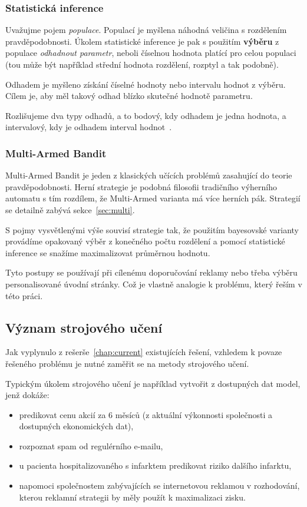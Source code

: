 \documentclass[thesis=M,czech]{FITthesis}[2014/05/07]
\begin{document}
\subsubsection{Statistická inference}
\label{inferno}
Uvažujme pojem \emph{populace}. Populací je myšlena náhodná veličina s rozdělením pravděpodobnosti. Úkolem statistické inference je pak s použitím \textbf{výběru} z populace \emph{odhadnout parametr}, neboli číselnou hodnota platící pro celou populaci (tou může být například střední hodnota rozdělení, rozptyl a tak podobně).

Odhadem je myšleno získání číselné hodnoty nebo intervalu hodnot z výběru. Cílem je, aby měl takový odhad blízko skutečné hodnotě parametru.

Rozlišujeme dva typy odhadů, a to bodový, kdy odhadem je jedna hodnota, a intervalový, kdy je odhadem interval hodnot~\cite{pst5}. 

\subsubsection{Multi-Armed Bandit}
\label{sub:mabandit}
Multi-Armed Bandit je jeden z klasických učících problémů zasahující do teorie pravděpodobnosti. Herní strategie je podobná filosofii tradičního výherního automatu s tím rozdílem, že Multi-Armed varianta má více herních pák. Strategií se detailně zabývá sekce~\ref{sec:multi}.

S pojmy vysvětlenými výše souvisí strategie tak, že použitím bayesovské varianty provádíme opakovaný výběr z konečného počtu rozdělení a pomocí statistické inference se snažíme maximalizovat průměrnou hodnotu.

Tyto postupy se používají při cílenému doporučování reklamy nebo třeba výběru personalisované úvodní stránky. Což je vlastně analogie k problému, který řeším v této práci.

\subsection{Význam strojového učení}
\label{sec:machine}

Jak vyplynulo z rešerše~\ref{chap:current} existujících řešení, vzhledem k povaze řešeného problému je nutné zaměřit se na metody strojového učení. 

Typickým úkolem strojového učení je například vytvořit z dostupných dat model, jenž dokáže:

\begin{itemize}
  \item predikovat cenu akcií za 6 měsíců (z aktuální výkonnosti společnosti a dostupných ekonomických dat),
  \item rozpoznat spam od regulérního e-mailu,
  \item u pacienta hospitalizovaného s infarktem predikovat riziko dalšího infarktu,
  \item napomoci společnostem zabývajících se internetovou reklamou v rozhodování, kterou reklamní strategii by měly použít k maximalizaci zisku.
\end{itemize}
\end{document}
